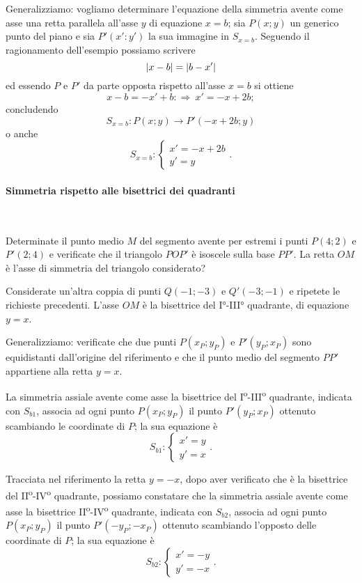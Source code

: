 Generalizziamo: vogliamo determinare l'equazione della simmetria avente come asse una retta parallela all'asse $y$ di equazione $x=b$; sia $P(x;y)$ un generico punto del piano e sia $P'(x':y')$ la sua immagine in $S_{x=b}$. Seguendo il ragionamento dell'esempio possiamo scrivere \[\valass{x-b}=\valass{b-x'}\]
ed essendo $P$ e $P'$ da parte opposta rispetto all'asse $x=b$ si ottiene
\[x-b=-x'+b:\Rightarrow\: x'=-x+2b;\]
concludendo
\[S_{x=b}:P(x;y)\rightarrow P'(-x+2b;y)\]
o anche
\[S_{x=b}:\begin{cases}x'=-x+2b\\y'=y \end{cases}.\]


\paragraph{Simmetria rispetto alle bisettrici dei quadranti}
~

\begin{exrig}
\begin{esempio}
Determinate il punto medio $M$ del segmento avente per estremi i punti $P(4;2)$ e $P'(2;4)$ e verificate che il triangolo $POP'$ è isoscele sulla base $PP'$. 
La retta $OM$ è l'asse di simmetria del triangolo considerato?

\begin{figure*}[!htb]
	\centering
\end{figure*}

Considerate un'altra coppia di punti $Q(-1;-3)$ e $Q'(-3;-1)$ e ripetete le richieste precedenti.
L'asse $OM$ è la bisettrice del I°-III° quadrante, di equazione $y=x$.
\end{esempio}
\end{exrig}

Generalizziamo: verificate che due punti $P(x_P;y_P)$ e $P'(y_P;x_P)$ sono equidistanti dall'origine del riferimento e che il punto medio del segmento $PP'$ appartiene alla retta $y=x$.

La simmetria assiale avente come asse la bisettrice del I\textsuperscript{o}-III\textsuperscript{o} quadrante, indicata con $S_{b1}$, associa ad ogni punto $P(x_P;y_P)$ il punto $P'(y_P;x_P)$ ottenuto scambiando le coordinate di $P$; la sua equazione è
\[S_{b1}:\begin{cases}x'=y\\y'=x \end{cases}.\]

Tracciata nel riferimento la retta $y=-x$, dopo aver verificato che è la bisettrice del II\textsuperscript{o}-IV\textsuperscript{o} quadrante, possiamo constatare che la simmetria assiale avente come asse la bisettrice II\textsuperscript{o}-IV\textsuperscript{o} quadrante, indicata con $S_{b2}$, associa ad ogni punto $P(x_P;y_P)$ il punto $P'(-y_P;-x_P)$ ottenuto scambiando l'opposto delle coordinate di $P$; la sua equazione è
\[S_{b2}:\begin{cases}x'=-y\\y'=-x \end{cases}.\]


